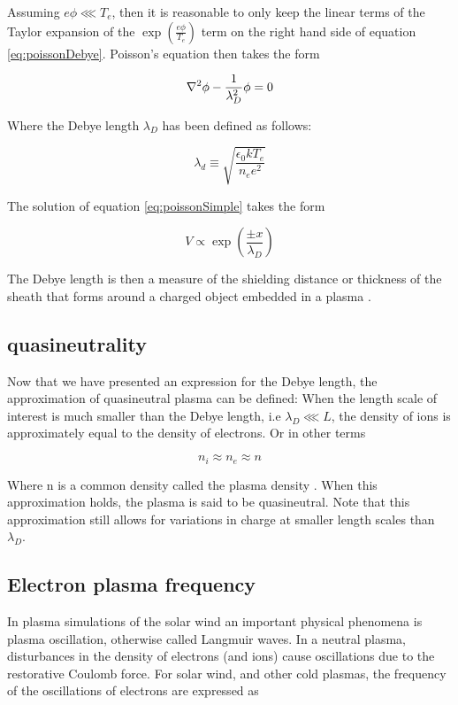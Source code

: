 Assuming $e \phi \lll T_e$, then it is reasonable to only keep the linear terms of the Taylor expansion of the $\exp (\frac{e \phi}{T_e})$ term on the right hand side of equation \ref{eq:poissonDebye}. Poisson's equation then takes the form

\begin{equation}\label{eq:poissonSimple}
    \laplacian{\phi} - \frac{1}{\lambda_D^2} \phi = 0
\end{equation}


Where the Debye length $\lambda_D$ has been defined as follows:

\begin{equation}\label{eq:Helmholtz}
    \lambda_d \equiv \sqrt{\frac{\epsilon_0 k T_e}{n_e e^2}}
\end{equation}

The solution of equation \ref{eq:poissonSimple} takes the form

\begin{equation*}
    V \propto \exp (\frac{\pm x}{\lambda_D})
\end{equation*}

The Debye length is then a measure of the shielding distance or thickness of the sheath that forms around a charged object embedded in a plasma .


\subsection{quasineutrality}
Now that we have presented an expression for the Debye length, the approximation of quasineutral plasma can be defined: When the length scale of interest is much smaller than the Debye length, i.e $\lambda_D \lll L$, the density of ions is approximately equal to the density of electrons. Or in other terms

\begin{equation}
    n_i \approx n_e \approx n
\end{equation}

Where n is a common density called the plasma density . When this approximation holds, the plasma is said to be quasineutral. Note that this approximation still allows for variations in charge at smaller length scales than $\lambda_D$. 

\subsection{Electron plasma frequency}
In plasma simulations of the solar wind an important physical phenomena is plasma oscillation, otherwise called Langmuir waves. In a neutral plasma, disturbances in the density of electrons (and ions) cause oscillations due to the restorative Coulomb force. For solar wind, and other cold plasmas, the frequency of the oscillations of electrons are expressed as

